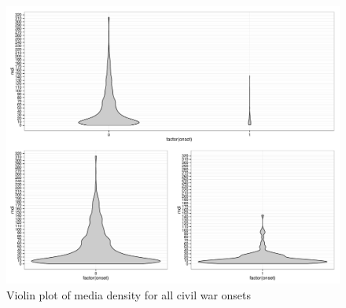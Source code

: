 \documentclass[11pt,article,oneside]{memoir}
\makeatletter
\def\maxwidth{\ifdim\Gin@nat@width>\linewidth\linewidth
\else\Gin@nat@width\fi}
\let\Oldincludegraphics\includegraphics
\renewcommand{\includegraphics}[1]{\Oldincludegraphics[width=\maxwidth]{#1}}
\makeatother
\begin{document}
\begin{figure}[htbp]
\centering
\includegraphics{figure/violinplot.pdf}
\caption{Violin plot of media density for all civil war onsets}
\end{figure}
\end{document}
